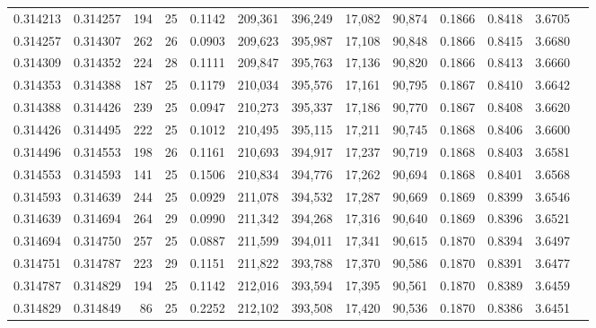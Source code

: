 \begin{tabular}{rrrrrrrrrrrrr}
0.314213 & 0.314257 &   194 &  25 &                                     0.1142 & 209,361 & 396,249 &  17,082 &  90,874 & 0.1866 & 0.8418 & 3.6705 \\
0.314257 & 0.314307 &   262 &  26 &                                     0.0903 & 209,623 & 395,987 &  17,108 &  90,848 & 0.1866 & 0.8415 & 3.6680 \\
0.314309 & 0.314352 &   224 &  28 &                                     0.1111 & 209,847 & 395,763 &  17,136 &  90,820 & 0.1866 & 0.8413 & 3.6660 \\
0.314353 & 0.314388 &   187 &  25 &                                     0.1179 & 210,034 & 395,576 &  17,161 &  90,795 & 0.1867 & 0.8410 & 3.6642 \\
0.314388 & 0.314426 &   239 &  25 &                                     0.0947 & 210,273 & 395,337 &  17,186 &  90,770 & 0.1867 & 0.8408 & 3.6620 \\
0.314426 & 0.314495 &   222 &  25 &                                     0.1012 & 210,495 & 395,115 &  17,211 &  90,745 & 0.1868 & 0.8406 & 3.6600 \\
0.314496 & 0.314553 &   198 &  26 &                                     0.1161 & 210,693 & 394,917 &  17,237 &  90,719 & 0.1868 & 0.8403 & 3.6581 \\
0.314553 & 0.314593 &   141 &  25 &                                     0.1506 & 210,834 & 394,776 &  17,262 &  90,694 & 0.1868 & 0.8401 & 3.6568 \\
0.314593 & 0.314639 &   244 &  25 &                                     0.0929 & 211,078 & 394,532 &  17,287 &  90,669 & 0.1869 & 0.8399 & 3.6546 \\
0.314639 & 0.314694 &   264 &  29 &                                     0.0990 & 211,342 & 394,268 &  17,316 &  90,640 & 0.1869 & 0.8396 & 3.6521 \\
0.314694 & 0.314750 &   257 &  25 &                                     0.0887 & 211,599 & 394,011 &  17,341 &  90,615 & 0.1870 & 0.8394 & 3.6497 \\
0.314751 & 0.314787 &   223 &  29 &                                     0.1151 & 211,822 & 393,788 &  17,370 &  90,586 & 0.1870 & 0.8391 & 3.6477 \\
0.314787 & 0.314829 &   194 &  25 &                                     0.1142 & 212,016 & 393,594 &  17,395 &  90,561 & 0.1870 & 0.8389 & 3.6459 \\
0.314829 & 0.314849 &    86 &  25 &                                     0.2252 & 212,102 & 393,508 &  17,420 &  90,536 & 0.1870 & 0.8386 & 3.6451 \\

\end{tabular}
